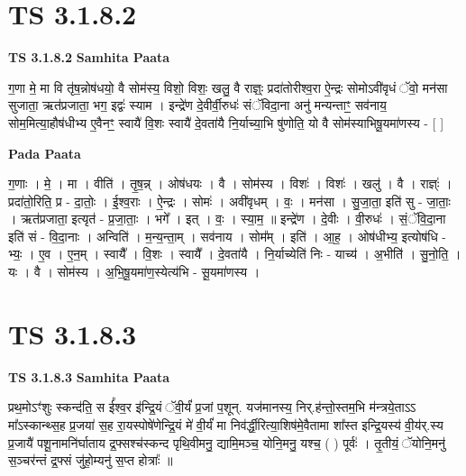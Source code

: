 \documentclass[17pt]{extarticle}
\begin{document}

\section{ TS 3.1.8.2 }

\textbf{TS 3.1.8.2 } \newline
\textbf{Samhita Paata} \newline

ग॒णा मे॒ मा वि तृ॑ष॒न्नोष॑धयो॒ वै सोम॑स्य॒ विशो॒ विशः॒ खलु॒ वै राज्ञ्ः॒ प्रदा॑तोरीश्व॒रा ऐ॒न्द्रः सोमोऽवी॑वृधं ॅवो॒ मन॑सा सुजाता॒ ऋत॑प्रजाता॒ भग॒ इद्वः॑ स्याम । इन्द्रे॑ण दे॒वीर्वी॒रुधः॑ संॅविदा॒ना अनु॑ मन्यन्ताꣳ॒॒ सव॑नाय॒ सोम॒मित्या॒हौष॑धीभ्य ए॒वैनꣳ॒॒ स्वायै॑ वि॒शः स्वायै॑ दे॒वता॑यै नि॒र्याच्या॒भि षु॑णोति॒ यो वै सोम॑स्याभिषू॒यमा॑णस्य - [  ] \newline

\textbf{Pada Paata} \newline

ग॒णाः । मे॒ । मा । वीति॑ । तृ॒ष॒न्न् । ओष॑धयः । वै । सोम॑स्य । विशः॑ । विशः॑ । खलु॑ । वै । राज्ञ्ः॑ । प्रदा॑तो॒रिति॒ प्र - दा॒तोः॒ । ई॒श्व॒राः । ऐ॒न्द्रः । सोमः॑ । अवी॑वृधम् । वः॒ । मन॑सा । सु॒जा॒ता॒ इति॑ सु - जा॒ताः॒ । ऋत॑प्रजाता॒ इत्यृत॑ - प्र॒जा॒ताः॒ । भगे᳚ । इत् । वः॒ । स्या॒म॒ ॥ इन्द्रे॑ण । दे॒वीः । वी॒रुधः॑ । सं॒ॅवि॒दा॒ना इति॑ सं - वि॒दा॒नाः । अन्विति॑ । म॒न्य॒न्ता॒म् । सव॑नाय । सोम᳚म् । इति॑ । आ॒ह॒ । ओष॑धीभ्य॒ इत्योष॑धि - भ्यः॒ । ए॒व । ए॒न॒म् । स्वायै᳚ । वि॒शः । स्वायै᳚ । दे॒वता॑यै । नि॒र्याच्येति॑ निः - याच्य॑ । अ॒भीति॑ । सु॒नो॒ति॒ । यः । वै । सोम॑स्य । अ॒भि॒षू॒यमा॑ण॒स्येत्य॑भि - सू॒यमा॑णस्य ।  \newline





\section{ TS 3.1.8.3 }

\textbf{TS 3.1.8.3 } \newline
\textbf{Samhita Paata} \newline

प्रथ॒मोऽꣳ॑शुः स्कन्द॑ति॒ स ई᳚श्व॒र इ॑न्द्रि॒यं ॅवी॒र्यं॑ प्र॒जां प॒शून्. यज॑मानस्य॒ निर्.ह॑न्तो॒स्तम॒भि म॑न्त्रये॒ताऽऽ मा᳚ऽस्कान्थ्स॒ह प्र॒जया॑ स॒ह रा॒यस्पोषे॑णेन्द्रि॒यं मे॑ वी॒र्यं॑ मा निव॑र्द्धी॒रित्या॒शिष॑मे॒वैतामा शा᳚स्त इन्द्रि॒यस्य॑ वी॒य॑र्.स्य प्र॒जायै॑ पशू॒नामनि॑र्घाताय द्र॒फ्सश्च॑स्कन्द पृथि॒वीमनु॒ द्यामि॒मञ्च॒ योनि॒मनु॒ यश्च॒ ( ) पूर्वः॑ । तृ॒तीयं॒ ॅयोनि॒मनु॑ स॒ञ्चर॑न्तं द्र॒फ्सं जु॑हो॒म्यनु॑ स॒प्त होत्राः᳚ ॥ \newline
\end{document}
